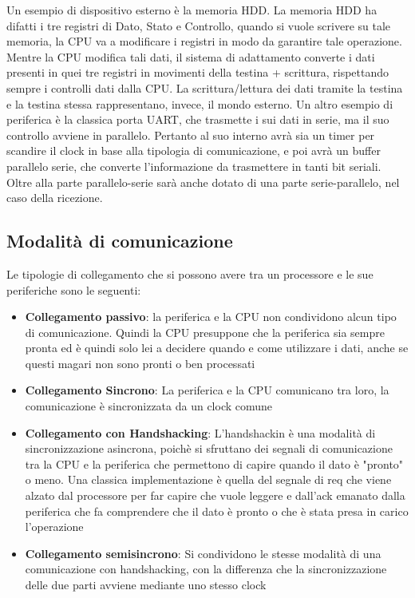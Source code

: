 Un esempio di dispositivo esterno è la memoria HDD.
La memoria HDD ha difatti i tre registri di Dato, Stato e Controllo, quando si vuole scrivere su tale memoria, la CPU va a modificare i registri in modo da garantire tale operazione. Mentre la CPU modifica tali dati, il sistema di adattamento converte i dati presenti in quei tre registri in movimenti della testina + scrittura, rispettando sempre i controlli dati dalla CPU. La scrittura/lettura dei dati tramite la testina e la testina stessa rappresentano, invece, il mondo esterno.
Un altro esempio di periferica è la classica porta UART, che trasmette i sui dati in serie, ma il suo controllo avviene in parallelo. Pertanto al suo interno avrà sia un timer per scandire il clock in base alla tipologia di comunicazione, e poi avrà un buffer parallelo serie, che converte l'informazione da trasmettere in tanti bit seriali. Oltre alla parte parallelo-serie sarà anche dotato di una parte serie-parallelo, nel caso della ricezione.


\subsection{Modalità di comunicazione}
Le tipologie di collegamento che si possono avere tra un processore e le sue periferiche sono le seguenti:
\begin{itemize}
    \item \textbf{Collegamento passivo}: la periferica e la CPU non condividono alcun tipo di comunicazione. Quindi la CPU presuppone che la periferica sia sempre pronta ed è quindi solo lei a decidere quando e come utilizzare i dati, anche se questi magari non sono pronti o ben processati
    \item \textbf{Collegamento Sincrono}: La periferica e la CPU comunicano tra loro, la comunicazione è sincronizzata da un clock comune
    \item \textbf{Collegamento con Handshacking}: L'handshackin è una modalità di sincronizzazione asincrona, poichè si sfruttano dei segnali di comunicazione tra la CPU e la periferica che permettono di capire quando il dato è "pronto" o meno. Una classica implementazione è quella del segnale di req che viene alzato dal processore per far capire che vuole leggere e dall'ack emanato dalla periferica che fa comprendere che il dato è pronto o che è stata presa in carico l'operazione
    \item \textbf{Collegamento semisincrono}: Si condividono le stesse modalità di una comunicazione con handshacking, con la differenza che la sincronizzazione delle due parti avviene mediante uno stesso clock
\end{itemize}

